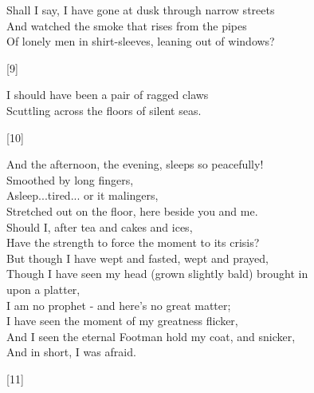 \documentclass{article}
\begin{document}
\begin{minipage}{10cm}
    Shall I say, I have gone at dusk through narrow streets\\
    And watched the smoke that rises from the pipes\\
    Of lonely men in shirt-sleeves, leaning out of windows?
    \begin{center}[9]\end{center}
    I should have been a pair of ragged claws\\
    Scuttling across the floors of silent seas.\\
    \begin{center}[10]\end{center}
\end{minipage}

\dotfill

\begin{minipage}{10cm}
    And the afternoon, the evening, sleeps so peacefully!\\
    Smoothed by long fingers,\\
    Asleep...tired... or it malingers,\\
    Stretched out on the floor, here beside you and me.\\
    Should I, after tea and cakes and ices,\\
    Have the strength to force the moment to its crisis?\\
    But though I have wept and fasted, wept and prayed,\\
    Though I have seen my head (grown slightly bald) brought in\\
    \quad{}upon a platter,\\
    I am no prophet - and here's no great matter;\\
    I have seen the moment of my greatness flicker,\\
    And I seen the eternal Footman hold my coat, and snicker,\\
    And in short, I was afraid.
    \begin{center}[11]\end{center}
\end{minipage}
\end{document}

